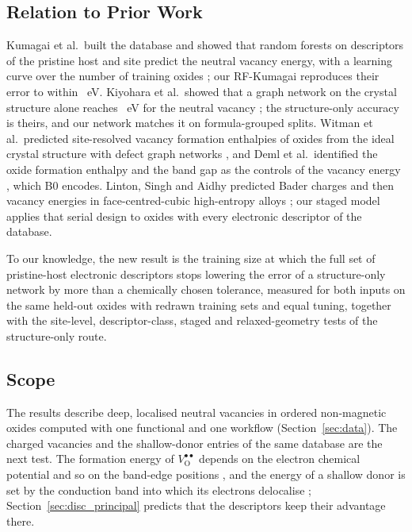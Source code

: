 \subsection{Relation to Prior Work}
\label{sec:disc_prior}

Kumagai et al.\ built the database and showed that random forests on descriptors of the pristine host and site predict the neutral vacancy energy, with a learning curve over the number of training oxides \citep{Kumagai2021insights}; our RF-Kumagai reproduces their error to within \numBaselinesSummaryRfKumagaiVsPublishedDifferenceEV{}~eV. Kiyohara et al.\ showed that a graph network on the crystal structure alone reaches \numNetPublishedMae{}~eV for the neutral vacancy \citep{Kiyohara2025machinelearning}; the structure-only accuracy is theirs, and our network matches it on formula-grouped splits. Witman et al.\ predicted site-resolved vacancy formation enthalpies of oxides from the ideal crystal structure with defect graph networks \citep{Witman2023defect}, and Deml et al.\ identified the oxide formation enthalpy and the band gap as the controls of the vacancy energy \citep{Deml2014oxide,Deml2015intrinsic}, which B0 encodes. Linton, Singh and Aidhy predicted Bader charges and then vacancy energies in face-centred-cubic high-entropy alloys \citep{Linton2026framework}; our staged model applies that serial design to oxides with every electronic descriptor of the database.

To our knowledge, the new result is the training size at which the full set of pristine-host electronic descriptors stops lowering the error of a structure-only network by more than a chemically chosen tolerance, measured for both inputs on the same held-out oxides with redrawn training sets and equal tuning, together with the site-level, descriptor-class, staged and relaxed-geometry tests of the structure-only route.

\subsection{Scope}
\label{sec:disc_scope}

The results describe deep, localised neutral vacancies in ordered non-magnetic oxides computed with one functional and one workflow (Section~\ref{sec:data}). The charged vacancies and the shallow-donor entries of the same database are the next test. The formation energy of $V_\mathrm{O}^{\bullet\bullet}$ depends on the electron chemical potential and so on the band-edge positions \citep{Freysoldt2014firstprinciples}, and the energy of a shallow donor is set by the conduction band into which its electrons delocalise \citep{Lany2005anion}; Section~\ref{sec:disc_principal} predicts that the descriptors keep their advantage there.

